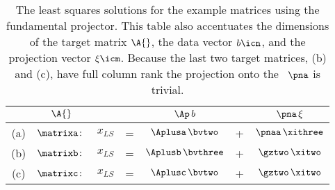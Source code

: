 \clearpage
\thispagestyle{empty}
\begin{landscape}
\begin{table}[htdp]
\caption[The least squares solutions for the example matrices using the fundamental projector]{The least squares solutions for the example matrices using the fundamental projector. This table also accentuates  the dimensions of the target matrix $\A{}$, the data vector $b\icn$, and the projection vector $\xi\icm$. Because the last two target matrices, (b) and (c), have full column rank the projection onto the \ns \ $\pna$ is trivial. }
\begin{center}
\begin{tabular}{ccrcccc}
%
  & $\A{}$ &&& $\Ap \, b$ && $\pna \, \xi$ \\\hline
%
  (a) & $\matrixa \colon$ & $x_{LS}$ &=& $\Aplusa \, \bvtwo$   &+& $\pnaa \, \xithree$ \\[15pt]
%
  (b) & $\matrixb \colon$ & $x_{LS}$ &=& $\Aplusb \, \bvthree$ &+& $\gztwo \, \xitwo$  \\[20pt]
%
  (c) & $\matrixc \colon$ & $x_{LS}$ &=& $\Aplusc \, \bvtwo$   &+& $\gztwo \, \xitwo$
%
\end{tabular}
\end{center}
\label{tab:projectors:least squares solutions}
\end{table}
\end{landscape}

\endinput